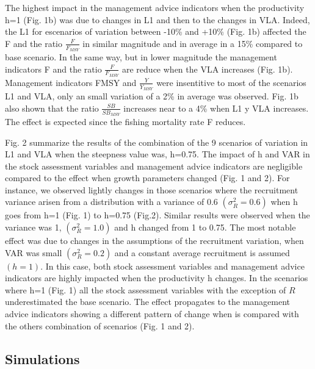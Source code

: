 \documentclass[11pt,letter,]{article}
\begin{document}
The highest impact in the management advice indicators when the
productivity h=1 (Fig. 1b) was due to changes in L1 and then to the
changes in VLA. Indeed, the L1 for escenarios of variation between -10\%
and +10\% (Fig. 1b) affected the F and the ratio \(\frac{F}{F_{MSY}}\)
in similar magnitude and in average in a 15\% compared to base scenario.
In the same way, but in lower magnitude the management indicators F and
the ratio \(\frac{F}{F_{MSY}}\) are reduce when the VLA increases (Fig.
1b). Management indicators FMSY and \(\frac{Y}{Y_{MSY}}\) were
insentitive to most of the scenarios L1 and VLA, only an small variation
of a 2\% in average was observed. Fig. 1b also shown that the ratio
\(\frac{SB}{SB_{MSY}}\) increases near to a 4\% when L1 y VLA increases.
The effect is expected since the fishing mortality rate F reduces.

Fig. 2 summarize the results of the combination of the 9 scenarios of
variation in L1 and VLA when the steepness value was, h=0.75. The impact
of h and VAR in the stock assessment variables and management advice
indicators are negligible compared to the effect when growth parameters
changed (Fig. 1 and 2). For instance, we observed lightly changes in
those scenarios where the recruitment variance arisen from a
distribution with a variance of 0.6 \((\sigma^2_R=0.6)\) when h goes
from h=1 (Fig. 1) to h=0.75 (Fig.2). Similar results were observed when
the variance was 1, \((\sigma^2_R=1.0)\) and h changed from 1 to 0.75.
The most notable effect was due to changes in the assumptions of the
recruitment variation, when VAR was small \((\sigma^2_R=0.2)\) and a
constant average recruitment is assumed \((h=1)\). In this case, both
stock assessment variables and management advice indicators are highly
impacted when the productivity h changes. In the scenarios where h=1
(Fig. 1) all the stock assessment variables with the exception of \(R\)
underestimated the base scenario. The effect propagates to the
management advice indicators showing a different pattern of change when
is compared with the others combination of scenarios (Fig. 1 and 2).

\subsection{Simulations}\label{simulations}
\end{document}
